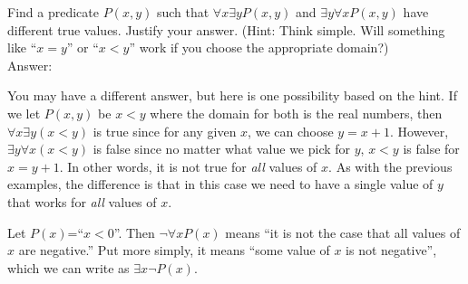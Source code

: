%


\begin{exer}
Find a predicate $P(x,y)$ such that $\forall x \exists y P(x,y)$ and $\exists y\forall x P(x,y)$ have
different true values.  Justify your answer.
(Hint:  Think simple.  Will something like ``$x=y$'' or ``$x<y$'' 
work if you choose the appropriate domain?)\\
Answer:\\
\vspace*{2.5in}
\begin{answer}
You may have a different answer, but here is one possibility based on the hint.
If we let $P(x,y)$ be $x<y$ where the domain for both is the real numbers, then 
 $\forall x \exists y (x<y)$ is true since for any given $x$, we can choose $y=x+1$.
 However, $\exists y\forall x (x<y)$ is false since no matter what value we pick for $y$, $x<y$ is false for
 $x=y+1$.  In other words, it is not true for {\em all} values of $x$.
 As with the previous examples, the difference is that in this case we need to have a single value of $y$
 that works for {\em all} values of $x$.
\end{answer}
\end{exer}

\begin{exa}
Let $P(x)$=``$x<0$''.  Then $\neg\forall x P(x)$ means ``it is not the case that all values of $x$ are negative.''
Put more simply, it means ``some value of $x$ is not negative'', which we can write as $\exists x\neg P(x)$.
\end{exa}

